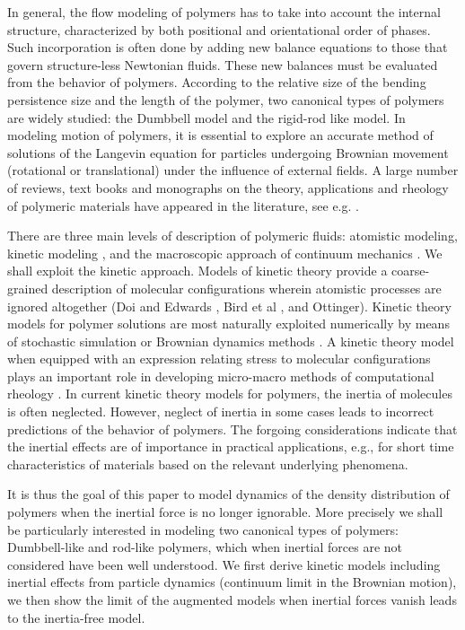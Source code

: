 \documentclass[reqno]{amsart}
\numberwithin{equation}{section}
\theoremstyle{definition}
\theoremstyle{remark}
\begin{document}
In general, the flow modeling of polymers has to take into account
the internal structure, characterized by both positional and
orientational order of phases. Such incorporation is often done by
adding new balance equations to those that govern structure-less
Newtonian fluids. These new balances must be evaluated from the
behavior of polymers. According to the relative size of the bending
persistence size and the length of the polymer, two canonical types
of polymers are widely studied: the Dumbbell model and the rigid-rod
like model. In modeling motion of polymers, it is essential to
explore an accurate method of solutions of the Langevin equation for
particles undergoing Brownian movement (rotational or translational)
under the influence of external fields. A large number of reviews,
text books and monographs on the theory, applications and rheology
of polymeric materials have appeared in the literature, see e.g.
\cite{Fl:1953, Fl:1969, He:1976, Fe:1980, Doi:1986, DE:1986,
BCAH:1987, GP:1993, Oe:1996, La:1999, Rd:2002}.

There are three main levels of description of polymeric fluids:
atomistic modeling, kinetic modeling \cite{DE:1986, He:1976}, and
the macroscopic approach of continuum mechanics \cite{BCAH:1987}. We
shall exploit the kinetic approach. Models of kinetic theory provide
a coarse-grained description of molecular configurations wherein
atomistic processes are ignored altogether (Doi and Edwards
\cite{DE:1986}, Bird et al \cite{BCAH:1987}, and
Ottinger\cite{Oe:1996}). Kinetic theory models for polymer solutions
are most naturally exploited numerically by means of stochastic
simulation or Brownian dynamics methods \cite{Oe:1996}.  A kinetic
theory model when equipped with an expression relating stress to
molecular configurations plays an important role in developing
micro-macro methods of computational rheology \cite{OP:2002,
Ke:2004}. In current kinetic theory models for polymers, the inertia
of molecules is often neglected. However, neglect of inertia in some
cases leads to incorrect predictions of the behavior of polymers.
The forgoing considerations indicate that the inertial effects are
of importance in practical applications, e.g., for short time
characteristics of materials based on the relevant underlying
phenomena.

It is thus the goal of this paper to model dynamics of the density
distribution of polymers when the inertial force is no longer
ignorable. More precisely we shall be particularly interested in
modeling two canonical types of polymers: Dumbbell-like and rod-like
polymers, which when inertial forces are not considered have been
well understood. We first derive kinetic models including inertial
effects from particle dynamics (continuum limit in the Brownian
motion), we then show the limit of the augmented models when
inertial forces vanish leads to the inertia-free model.
\end{document}
